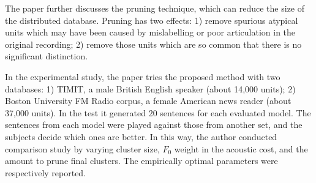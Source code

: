 The paper further discusses the pruning technique, which can reduce the size of the distributed database. Pruning has two effects: 1) remove spurious atypical units which may have been caused by mislabelling or poor articulation in the original recording; 2) remove those units which are so common that there is no significant distinction.

In the experimental study, the paper tries the proposed method with two databases: 1) TIMIT, a male British English speaker (about 14,000 units); 2) Boston University FM Radio corpus, a female American news reader (about 37,000 units). In the test it generated 20 sentences for each evaluated model. The sentences from each model were played against those from another set, and the subjects decide which ones are better. In this way, the author conducted comparison study by varying cluster size, $F_0$ weight in the acoustic cost, and the amount to prune final clusters. The empirically optimal parameters were respectively reported.
